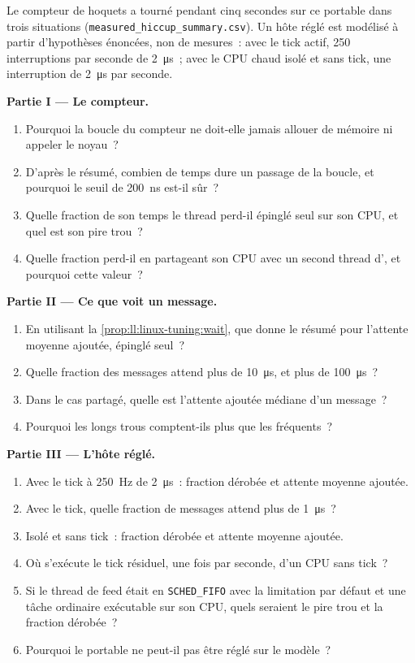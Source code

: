 \begin{problem}\label{pb:ll:linux-tuning:1}
Le compteur de hoquets a tourné pendant cinq secondes sur ce portable dans trois situations
(\texttt{measured\_hiccup\_summary.csv}). Un hôte réglé est modélisé à partir d'hypothèses énoncées, non de mesures~: avec le tick
actif, 250 interruptions par seconde de \qty{2}{\micro\second}~; avec le CPU chaud isolé et sans tick, une interruption de
\qty{2}{\micro\second} par seconde.

\medskip\noindent\textbf{Partie I --- Le compteur.}
\begin{enumerate}
\item Pourquoi la boucle du compteur ne doit-elle jamais allouer de mémoire ni appeler le noyau~?
\item D'après le résumé, combien de temps dure un passage de la boucle, et pourquoi le seuil de \qty{200}{\nano\second} est-il sûr~?
\item Quelle fraction de son temps le thread perd-il épinglé seul sur son CPU, et quel est son pire trou~?
\item Quelle fraction perd-il en partageant son CPU avec un second thread d', et pourquoi cette valeur~?
\end{enumerate}

\medskip\noindent\textbf{Partie II --- Ce que voit un message.}
\begin{enumerate}[resume]
\item En utilisant la \cref{prop:ll:linux-tuning:wait}, que donne le résumé pour l'attente moyenne ajoutée, épinglé seul~?
\item Quelle fraction des messages attend plus de \qty{10}{\micro\second}, et plus de \qty{100}{\micro\second}~?
\item Dans le cas partagé, quelle est l'attente ajoutée médiane d'un message~?
\item Pourquoi les longs trous comptent-ils plus que les fréquents~?
\end{enumerate}

\medskip\noindent\textbf{Partie III --- L'hôte réglé.}
\begin{enumerate}[resume]
\item Avec le tick à 250~Hz de \qty{2}{\micro\second}~: fraction dérobée et attente moyenne ajoutée.
\item Avec le tick, quelle fraction de messages attend plus de \qty{1}{\micro\second}~?
\item Isolé et sans tick~: fraction dérobée et attente moyenne ajoutée.
\item Où s'exécute le tick résiduel, une fois par seconde, d'un CPU sans tick~?
\item Si le thread de feed était en \texttt{SCHED\_FIFO} avec la limitation par défaut et une tâche ordinaire exécutable sur son CPU, quels
seraient le pire trou et la fraction dérobée~?
\item Pourquoi le portable ne peut-il pas être réglé sur le modèle~?
\end{enumerate}


\end{problem}
